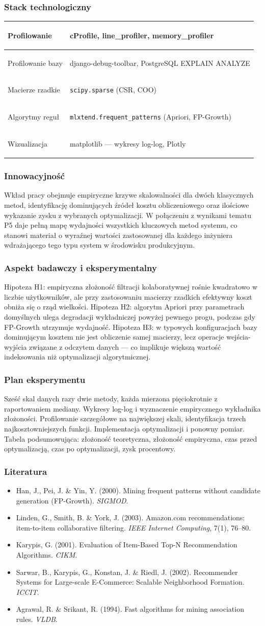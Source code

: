 \documentclass[12pt,a4paper]{article}
\newenvironment{stacktab}{%
    \arrayrulecolor{border}%
    \begin{tabular}{|>{\columncolor{lightbg}\bfseries\color{primary}\raggedright\arraybackslash}p{4.2cm}|>{\raggedright\arraybackslash}p{12cm}|}
    \hline
}{%
    \end{tabular}%
    \arrayrulecolor{black}%
}
\newcommand{\stackrow}[2]{#1 & #2 \\ \hline}
\newcommand{\topicsection}[1]{\subsubsection*{#1}}
\newenvironment{literatura}{%
    \topicsection{Literatura}
    \begin{itemize}[leftmargin=1.6em,labelsep=0.5em]
}{%
    \end{itemize}
}
\begin{document}
\topicsection{Stack technologiczny}
\begin{stacktab}
\stackrow{Profilowanie}{cProfile, line\_profiler, memory\_profiler}
\stackrow{Profilowanie bazy}{django-debug-toolbar, PostgreSQL EXPLAIN ANALYZE}
\stackrow{Macierze rzadkie}{\texttt{scipy.sparse} (CSR, COO)}
\stackrow{Algorytmy reguł}{\texttt{mlxtend.frequent\_patterns} (Apriori, FP-Growth)}
\stackrow{Wizualizacja}{matplotlib --- wykresy log-log, Plotly}
\end{stacktab}

\topicsection{Innowacyjność}
Wkład pracy obejmuje empiryczne krzywe skalowalności dla dwóch klasycznych metod, identyfikację dominujących źródeł kosztu obliczeniowego oraz ilościowe wykazanie zysku z wybranych optymalizacji. W połączeniu z wynikami tematu P5 daje pełną mapę wydajności wszystkich kluczowych metod systemu, co stanowi materiał o wyraźnej wartości zastosowanej dla każdego inżyniera wdrażającego tego typu system w środowisku produkcyjnym.

\topicsection{Aspekt badawczy i eksperymentalny}
Hipoteza H1: empiryczna złożoność filtracji kolaboratywnej rośnie kwadratowo w liczbie użytkowników, ale przy zastosowaniu macierzy rzadkich efektywny koszt obniża się o rząd wielkości. Hipoteza H2: algorytm Apriori przy parametrach domyślnych ulega degradacji wykładniczej powyżej pewnego progu, podczas gdy FP-Growth utrzymuje wydajność. Hipoteza H3: w typowych konfiguracjach bazy dominującym kosztem nie jest obliczenie samej macierzy, lecz operacje wejścia-wyjścia związane z odczytem danych --- co implikuje większą wartość indeksowania niż optymalizacji algorytmicznej.

\topicsection{Plan eksperymentu}
Sześć skal danych razy dwie metody, każda mierzona pięciokrotnie z raportowaniem mediany. Wykresy log-log i wyznaczenie empirycznego wykładnika złożoności. Profilowanie szczegółowe na największej skali, identyfikacja trzech najkosztowniejszych funkcji. Implementacja optymalizacji i ponowny pomiar. Tabela podsumowująca: złożoność teoretyczna, złożoność empiryczna, czas przed optymalizacją, czas po optymalizacji, zysk procentowy.

\begin{literatura}
\item Han, J., Pei, J. \& Yin, Y. (2000). Mining frequent patterns without candidate generation (FP-Growth). \textit{SIGMOD}.
\item Linden, G., Smith, B. \& York, J. (2003). Amazon.com recommendations: item-to-item collaborative filtering. \textit{IEEE Internet Computing}, 7(1), 76--80.
\item Karypis, G. (2001). Evaluation of Item-Based Top-N Recommendation Algorithms. \textit{CIKM}.
\item Sarwar, B., Karypis, G., Konstan, J. \& Riedl, J. (2002). Recommender Systems for Large-scale E-Commerce: Scalable Neighborhood Formation. \textit{ICCIT}.
\item Agrawal, R. \& Srikant, R. (1994). Fast algorithms for mining association rules. \textit{VLDB}.
\end{literatura}
\end{document}
